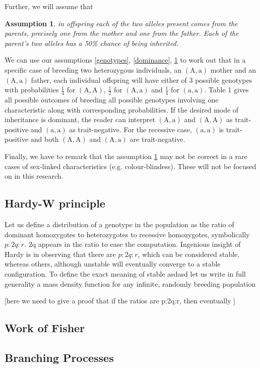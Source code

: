 \documentclass{l4proj}
\newtheorem{assum}{Assumption}
\newcommand{\genotype}[2]{\ensuremath{(\mathrm{#1}, \mathrm{#2})}}
\begin{document}
Further, we will assume that
\begin{assum}\label{offspring}
  in offspring each of the two alleles present comes from the parents, precisely one from the mother and one from the father. Each of the parent's two alleles has a 50\% chance of being inherited.
\end{assum}
We can use our assumptions \ref{genotypes}, \ref{dominance}, \ref{offspring} to work out that in a specific case of breeding two heterozygous individuals, an \genotype{A}{a} mother and an \genotype{A}{a} father, each individual offspring will have either of 3 possible genotypes with probabilities $\frac{1}{4}$ for \genotype{A}{A}, $\frac{1}{2}$ for \genotype{A}{a} and $\frac{1}{4}$ for \genotype{a}{a}. Table 1 gives all possible outcomes of breeding all possible genotypes involving one characteristic along with corresponding probabilities. If the desired mode of inheritance is dominant, the reader can interpret \genotype{A}{a} and \genotype{A}{A} as trait-positive and \genotype{a}{a} as trait-negative. For the recessive case, \genotype{a}{a} is trait-positive and both \genotype{A}{A} and \genotype{A}{a} are trait-negative.

Finally, we have to remark that the assumption \ref{offspring} may not be correct in a rare cases of sex-linked characteristics (e.g. colour-blindess). These will not be focused on in this research.

\subsection{Hardy-W principle}
Let us define a distribution of a genotype in the population as the ratio of dominant homozygotes to heterozygotes to recessive homozygotes, symbolically $p:2q:r$. 2q appears in the ratio to ease the computation.
Ingenious insight of Hardy is in observing that there are $p:2q:r$, which can be considered stable, whereas others, although unstable will eventually converge to a stable configuration. To define the exact meaning of stable asdasd let us write in full generality a mass density function for any infinite, randomly breeding population

[here we need to give a proof that if the ratios are p:2q:r, then eventually ]
 
\subsection{Work of Fisher}

\subsection{Branching Processes}
\end{document}
